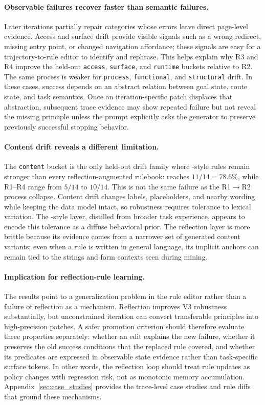 \paragraph{Observable failures recover faster than semantic failures.}
Later iterations partially repair categories whose errors leave direct page-level evidence. Access and surface drift provide visible signals such as a wrong redirect, missing entry point, or changed navigation affordance; these signals are easy for a trajectory-to-rule editor to identify and rephrase. This helps explain why R3 and R4 improve the held-out \texttt{access}, \texttt{surface}, and \texttt{runtime} buckets relative to R2. The same process is weaker for \texttt{process}, \texttt{functional}, and \texttt{structural} drift. In these cases, success depends on an abstract relation between goal state, route state, and task semantics. Once an iteration-specific patch displaces that abstraction, subsequent trace evidence may show repeated failure but not reveal the missing principle unless the prompt explicitly asks the generator to preserve previously successful stopping behavior.

\paragraph{Content drift reveals a different limitation.}
The \texttt{content} bucket is the only held-out drift family where \expel{}-style rules remain stronger than every reflection-augmented rulebook: \expel{} reaches \(11/14=78.6\%\), while R1--R4 range from \(5/14\) to \(10/14\). This is not the same failure as the R1$\to$R2 process collapse. Content drift changes labels, placeholders, and nearby wording while keeping the data model intact, so robustness requires tolerance to lexical variation. The \expel{}-style layer, distilled from broader task experience, appears to encode this tolerance as a diffuse behavioral prior. The reflection layer is more brittle because its evidence comes from a narrower set of generated content variants; even when a rule is written in general language, its implicit anchors can remain tied to the strings and form contexts seen during mining.

\paragraph{Implication for reflection-rule learning.}
The results point to a generalization problem in the rule editor rather than a failure of reflection as a mechanism. Reflection improves V3 robustness substantially, but unconstrained iteration can convert transferable principles into high-precision patches. A safer promotion criterion should therefore evaluate three properties separately: whether an edit explains the new failure, whether it preserves the old success conditions that the replaced rule covered, and whether its predicates are expressed in observable state evidence rather than task-specific surface tokens. In other words, the reflection loop should treat rule updates as policy changes with regression risk, not as monotonic memory accumulation. Appendix~\ref{sec:case_studies} provides the trace-level case studies and rule diffs that ground these mechanisms.
